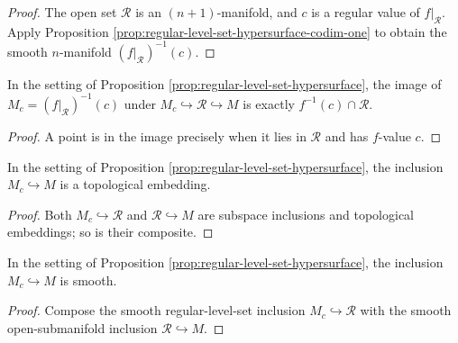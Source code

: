 \begin{proof}
\leanok
{}
\sketch The open set $\mathcal R$ is an $(n+1)$-manifold, and $c$ is a regular value
of $f|_{\mathcal R}$. Apply Proposition
\ref{prop:regular-level-set-hypersurface-codim-one} to obtain the smooth
$n$-manifold $(f|_{\mathcal R})^{-1}(c)$.
\end{proof}

\begin{lemma}
\label{lem:regular-part-image}
\leanok
{}
In the setting of Proposition \ref{prop:regular-level-set-hypersurface}, the image
of $M_c=(f|_{\mathcal R})^{-1}(c)$ under $M_c\hookrightarrow\mathcal R\hookrightarrow M$
is exactly $f^{-1}(c)\cap\mathcal R$.
\end{lemma}

\begin{proof}
\leanok
\sketch A point is in the image precisely when it lies in $\mathcal R$ and has
$f$-value $c$.
\end{proof}

\begin{lemma}
\label{lem:regular-part-embedded}
\leanok
{}
In the setting of Proposition \ref{prop:regular-level-set-hypersurface}, the inclusion
$M_c\hookrightarrow M$ is a topological embedding.
\end{lemma}

\begin{proof}
\leanok
\sketch Both $M_c\hookrightarrow\mathcal R$ and $\mathcal R\hookrightarrow M$ are
subspace inclusions and topological embeddings; so is their composite.
\end{proof}

\begin{lemma}
\label{lem:regular-part-inclusion-smooth}
\leanok
{}
In the setting of Proposition \ref{prop:regular-level-set-hypersurface}, the inclusion
$M_c\hookrightarrow M$ is smooth.
\end{lemma}

\begin{proof}
\leanok
{}
\sketch Compose the smooth regular-level-set inclusion $M_c\hookrightarrow\mathcal R$
with the smooth open-submanifold inclusion $\mathcal R\hookrightarrow M$.
\end{proof}

